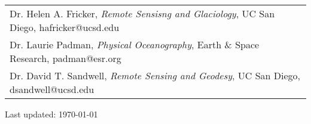 \documentclass[a4paper,11pt]{article}
\begin{document}
\begin{small}
\begin{tabular}{p{}}
Dr. Helen A. Fricker, {\it Remote Sensisng and Glaciology}, UC San Diego, hafricker@ucsd.edu\\
Dr. Laurie Padman, {\it Physical Oceanography}, Earth \& Space Research, padman@esr.org\\
Dr. David T. Sandwell, {\it Remote Sensing and Geodesy}, UC San Diego, dsandwell@ucsd.edu
\end{tabular}
\end{small}


\bigskip
\begin{center}
  \begin{footnotesize}
  \textcolor[gray]{0.45}{Last updated: \today}\\
  \end{footnotesize}
\end{center}

\newpage

\end{document}

